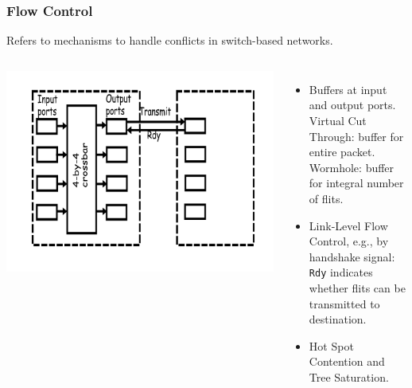 \documentclass{beamer}
\newcommand{\emp}[1]{\textcolor{DikuRed}{ #1}}
\begin{document}
\begin{frame}[fragile,t]
\frametitle{Flow Control}

Refers to mechanisms to handle conflicts in switch-based networks.

\begin{columns}
\includegraphics[width=50ex]{Figures/FigsInterconnect/Conflicts1}
\vspace{-1ex}
\begin{itemize}
    \item Buffers at input and output ports.\\
          Virtual Cut Through: buffer for entire packet.\\
          Wormhole: buffer for integral number of {\sc flit}s.\medskip
    \item \emp{Link-Level Flow Control}, e.g., by handshake signal:\\
            {\tt Rdy} indicates whether {\sc flit}s can be transmitted to destination. 
    \item Hot Spot Contention and Tree Saturation. 
\end  {itemize}
\end{columns}

\end{frame}
\end{document}
